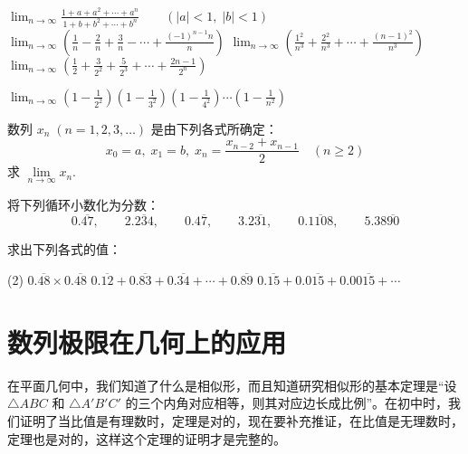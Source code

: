 \begin{Exercise}
\begin{question}
  \begin{tasks}
      \task $\displaystyle \lim _{n\to  \infty} \frac{1+a+a^{2}+\cdots+a^{n}}{1+b+b^{2}+\cdots+b^{n}} \qquad(|a|<1,\;|b|<1)$
      \task $\displaystyle \lim _{n\to  \infty}\left(\frac{1}{n}-\frac{2}{n}+\frac{3}{n}-\cdots+\frac{(-1)^{n-1} n}{n}\right)$
      \task $\displaystyle \lim _{n\to  \infty}\left(\frac{1^{2}}{n^{3}}+\frac{2^{2}}{n^{3}}+\cdots+\frac{(n-1)^{2}}{n^{3}}\right)$
      \task $\displaystyle \lim _{n\to  \infty}\left(\frac{1}{2}+\frac{3}{{2^2}}+\frac{5}{2^3}+\cdots+\frac{2n-1}{2^{n}}\right)$
  \end{tasks}
  \item $\displaystyle \lim_{n\to  \infty}\left(1-\frac{1}{2^2}\right)\left(1-\frac{1}{3^2}\right)\left(1-\frac{1}{4^2}\right)\cdots\left(1-\frac{1}{n^2}\right)$
  \item 数列 $x_n\; (n=1,2,3,\ldots)$ 是由下列各式所确定：
\[x_0=a,\; x_1=b,\; x_n=\frac{x_{n-2}+x_{n-1}}{2}\quad (n\ge 2)\]
求 $\lim\limits_{n\to\infty}x_n$.
  \item 将下列循环小数化为分数：
  \[0.\overline{47},\qquad 2.\overline{234},\qquad 0.4\overline{7},\qquad 3.2\overline{31},\qquad 0.\overline{1108},\qquad 5.38\overline{90}\]
  \item 求出下列各式的值：
  \begin{tasks}(2)
    \task $0.\overline{48}\times0.\overline{48}$
    \task $0.\overline{12}+0.\overline{83}+0.\overline{34}+\cdots+0.\overline{89}$
    \task $0.\overline{15}+0.0\overline{15}+0.00\overline{15}+\cdots$
  \end{tasks}
\end{question}
\end{Exercise}

\section{数列极限在几何上的应用}
在平面几何中，我们知道了什么是相似形，而且知道研究相似形的基本定理是“设 $\triangle ABC$ 和 $\triangle A'B'C'$ 的三个内角对应相等，则其对应边长成比例”。在初中时，我们证明了当比值是有理数时，定理是对的，现在要补充推证，在比值是无理数时，定理也是对的，这样这个定理的证明才是完整的。

